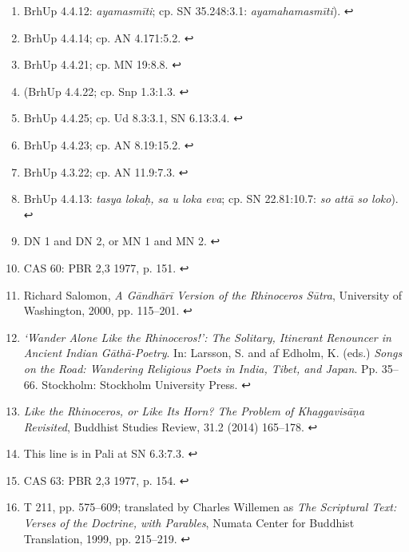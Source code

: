 \documentclass[12pt,openany]{book}%
\begin{document}
\begin{enumerate}
%
\item BrhUp 4.4.12: \textit{\textsanskrit{ayamasmīti}}; cp. SN 35.248:3.1: \textit{\textsanskrit{ayamahamasmīti}}). ↩

%
\item BrhUp 4.4.14; cp. AN 4.171:5.2. ↩

%
\item BrhUp 4.4.21; cp. MN 19:8.8. ↩

%
\item (BrhUp 4.4.22; cp. Snp 1.3:1.3. ↩

%
\item BrhUp 4.4.25; cp. Ud 8.3:3.1, SN 6.13:3.4. ↩

%
\item BrhUp 4.4.23; cp. AN 8.19:15.2. ↩

%
\item BrhUp 4.3.22; cp. AN 11.9:7.3. ↩

%
\item BrhUp 4.4.13: \textit{tasya lokaḥ, sa u loka eva}; cp. SN 22.81:10.7: \textit{so \textsanskrit{attā} so loko}). ↩

%
\item DN 1 and DN 2, or MN 1 and MN 2. ↩

%
\item CAS 60: PBR 2,3 1977, p. 151. ↩

%
\item Richard Salomon, \textit{A \textsanskrit{Gāndhārī} Version of the Rhinoceros \textsanskrit{Sūtra}}, University of Washington, 2000, pp. 115–201. ↩

%
\item \textit{‘Wander Alone Like the Rhinoceros!’: The Solitary, Itinerant Renouncer in Ancient Indian \textsanskrit{Gāthā}-Poetry}. In: Larsson, S. and af Edholm, K. (eds.) \textit{Songs on the Road: Wandering Religious Poets in India, Tibet, and Japan}. Pp. 35–66. Stockholm: Stockholm University Press. ↩

%
\item \textit{Like the Rhinoceros, or Like Its Horn? The Problem of \textsanskrit{Khaggavisāṇa} Revisited}, Buddhist Studies Review, 31.2 (2014) 165–178. ↩

%
\item This line is in Pali at SN 6.3:7.3. ↩

%
\item CAS 63: PBR 2,3 1977, p. 154. ↩

%
\item T 211, pp. 575–609; translated by Charles Willemen as \textit{The Scriptural Text: Verses of the Doctrine, with Parables}, Numata Center for Buddhist Translation, 1999, pp. 215–219. ↩


\end{enumerate}
\end{document}
